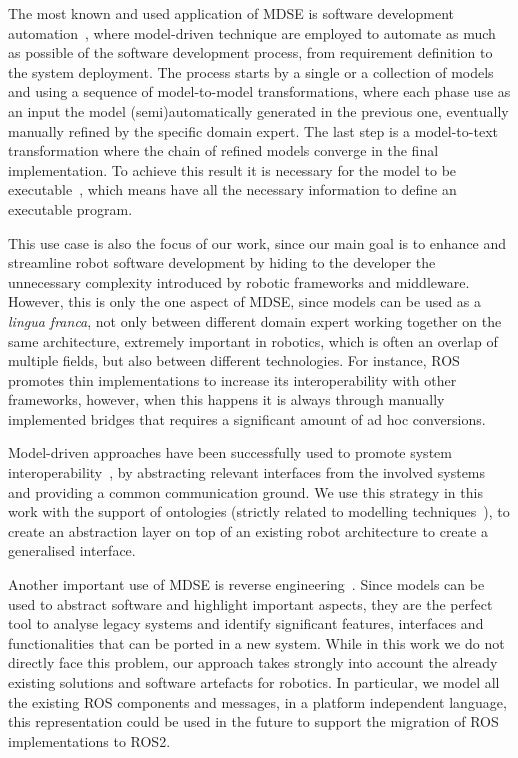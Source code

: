 The most known and used application of MDSE is software development automation~\cite{sendall2003model}, where model-driven technique are employed to automate as much as possible of the software development process, from requirement definition to the system deployment. The process starts by a single or a collection of models and using a sequence of model-to-model transformations, where each phase use as an input the model (semi)automatically generated in the previous one, eventually manually refined by the specific domain expert. The last step is a model-to-text transformation where the chain of refined models converge in the final implementation. To achieve this result it is necessary for the model to be executable~\cite{mellor2002executable}, which means have all the necessary information to define an executable program.

This use case is also the focus of our work, since our main goal is to enhance and streamline robot software development by hiding to the developer the unnecessary complexity introduced by robotic frameworks and middleware. However, this is only the one aspect of MDSE, since models can be used as a \textit{lingua franca}, not only between different domain expert working together on the same architecture, extremely important in robotics, which is often an overlap of multiple fields, but also between different technologies. For instance, ROS promotes thin implementations to increase its interoperability with other frameworks, however, when this happens it is always through manually implemented bridges that requires a significant amount of ad hoc conversions.

Model-driven approaches have been successfully used to promote system interoperability~\cite{chungoora2013model}, by abstracting relevant interfaces from the involved systems and providing a common communication ground. We use this strategy in this work with the support of ontologies (strictly related to modelling techniques~\cite{guizzardi2007ontology}), to create an abstraction layer on top of an existing robot architecture to create a generalised interface.

Another important use of MDSE is reverse engineering~\cite{bruneliere2010modisco, rugaber2004model}. Since models can be used to abstract software and highlight important aspects, they are the perfect tool to analyse legacy systems and identify significant features, interfaces and functionalities that can be ported in a new system. While in this work we do not directly face this problem, our approach takes strongly into account the already existing solutions and software artefacts for robotics. In particular, we model all the existing ROS components and messages, in a platform independent language, this representation could be used in the future to support the migration of ROS implementations to ROS2.

